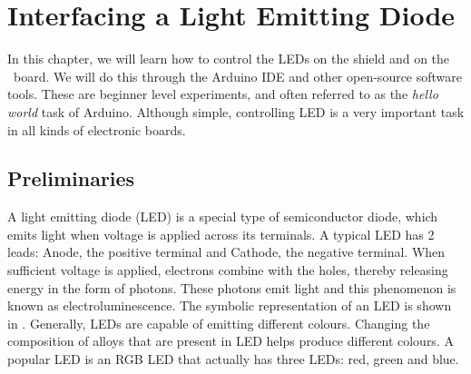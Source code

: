 \chapter {Interfacing a Light Emitting Diode}
\thispagestyle{empty}
\label{led}
\newcommand{\LocLEDfig}{\Origin/user-code/led/figures}
\newcommand{\LocLEDscicode}{\Origin/user-code/led/scilab}
\newcommand{\LocLEDscibrief}[1]{{\tt \seqsplit{%
        Origin/user-code/led/scilab/#1}}, see \fnrefp{fn:file-loc}}
\newcommand{\LocLEDardcode}{\Origin/user-code/led/arduino}
\newcommand{\LocLEDardbrief}[1]{{\tt \seqsplit{%
        Origin/user-code/led/arduino/#1}}, see \fnrefp{fn:file-loc}}

\newcommand{\LocLEDpycode}{\Origin/user-code/led/python}  %
\newcommand{\LocLEDpybrief}[1]{{\tt \seqsplit{%
        Origin/user-code/led/python/#1}}, see \fnrefp{fn:file-loc}} %


\newcommand{\LocLEDjuliacode}{\Origin/user-code/led/julia}  %
\newcommand{\LocLEDjuliabrief}[1]{{\tt \seqsplit{%
        Origin/user-code/led/julia/#1}}, see \fnrefp{fn:file-loc}} %

\newcommand{\LocLEDOpenModelicacode}{\Origin/user-code/led/OpenModelica}  %
\newcommand{\LocLEDOpenModelicabrief}[1]{{\tt \seqsplit{%
        Origin/user-code/led/OpenModelica/#1}}, see \fnrefp{fn:file-loc}} %


In this chapter, we will learn how to control the LEDs on the shield
and on the \arduino\ board.  We will do this through the Arduino IDE and other open-source software tools. 
These are beginner level experiments,
and often referred to as the \emph{hello world} task of Arduino.
Although simple, controlling LED is a very important task in all
kinds of electronic boards.

\section{Preliminaries}
\label{sec:led-pril}
A light emitting diode (LED) is a special type of semiconductor diode,
which emits light when voltage is applied across its terminals. A
typical LED has 2 leads: Anode, the positive terminal and Cathode, the
negative terminal.  When sufficient voltage is applied, electrons
combine with the holes, thereby releasing energy in the form of
photons.  These photons emit light and this phenomenon is known as
electroluminescence.  The symbolic representation of an LED is shown
in .  Generally, LEDs are capable of emitting
different colours.  Changing the composition of alloys that are
present in LED helps produce different colours.  A popular LED is an
RGB LED that actually has three LEDs: red, green and blue.


